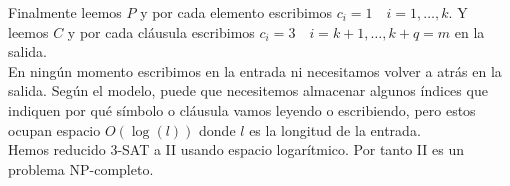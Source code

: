 \documentclass{article}
\begin{document}
Finalmente leemos $P$ y por cada elemento escribimos
$c_i=1\quad i=1,\ldots,k$. Y leemos $C$ y por cada cláusula escribimos
$c_i=3\quad i=k+1,\ldots,k+q=m$ en la salida. \\

En ningún momento escribimos en la entrada ni necesitamos volver a
atrás en la salida. Según el modelo, puede que necesitemos almacenar
algunos índices que indiquen por qué símbolo o cláusula vamos leyendo
o escribiendo, pero estos ocupan espacio $O(\log(l))$ donde $l$ es la
longitud de la entrada. \\

Hemos reducido 3-SAT a II usando espacio logarítmico. Por tanto II es
un problema NP-completo.
\end{document}
